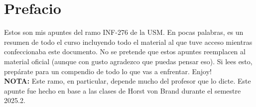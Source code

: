 \chapter*{Prefacio}

Estos son mis apuntes del ramo INF-276 de la USM. En pocas
palabras, es un resumen de todo el curso incluyendo todo
el material al que tuve acceso mientras confeccionaba este
documento. No se pretende que estos apuntes reemplacen al
material oficial (aunque con gusto agradezco que puedas
pensar eso). Si lees esto, prepárate para un compendio de
todo lo que vas a enfrentar.
Enjoy! \\

\textbf{NOTA:} Este ramo, en particular, depende mucho del
profesor que lo dicte. Este apunte fue hecho en base a las
clases de Horst von Brand durante el semestre 2025.2.
